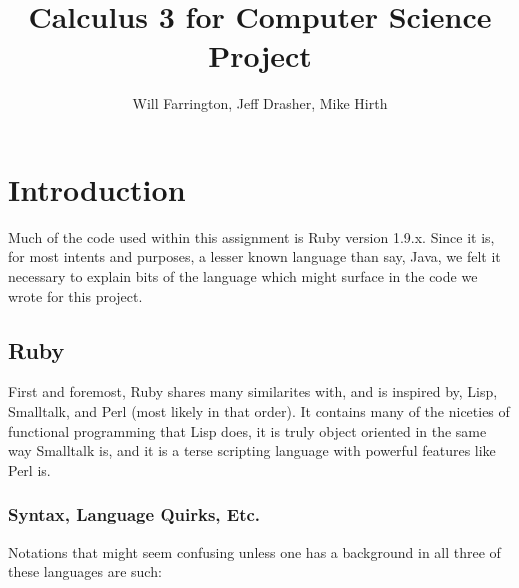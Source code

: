 \documentclass[letterpaper,12pt]{article}
\author{Will Farrington, Jeff Drasher, Mike Hirth}
\title{Calculus 3 for Computer Science Project}
\begin{document}
\maketitle
\tableofcontents
\newpage
\section{Introduction}

Much of the code used within this assignment is Ruby version 1.9.x.
Since it is, for most intents and purposes, a lesser known language than say,
Java, we felt it necessary to explain bits of the language which might surface
in the code we wrote for this project.

\subsection{Ruby}

First and foremost, Ruby shares many similarites with, and is inspired by, Lisp,
Smalltalk, and Perl (most likely in that order).
It contains many of the niceties of functional programming that Lisp does, it is
truly object oriented in the same way Smalltalk is, and it is a terse scripting
language with powerful features like Perl is.

\subsubsection{Syntax, Language Quirks, Etc.}

Notations that might seem confusing unless one has a background in all three of
these languages are such:
\end{document}
